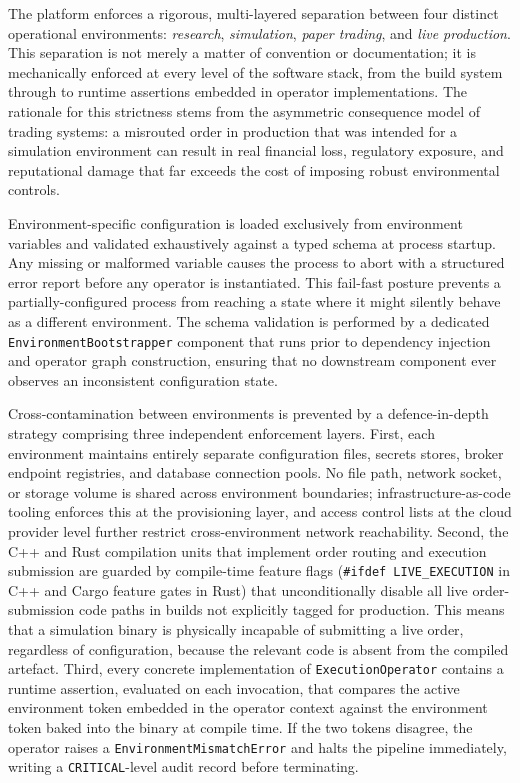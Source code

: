 \documentclass[12pt,openany]{book}
\numberwithin{equation}{chapter}
\theoremstyle{plain}
\theoremstyle{definition}
\theoremstyle{remark}
\begin{document}
The platform enforces a rigorous, multi-layered separation between four distinct operational environments: \emph{research}, \emph{simulation}, \emph{paper trading}, and \emph{live production}. This separation is not merely a matter of convention or documentation; it is mechanically enforced at every level of the software stack, from the build system through to runtime assertions embedded in operator implementations. The rationale for this strictness stems from the asymmetric consequence model of trading systems: a misrouted order in production that was intended for a simulation environment can result in real financial loss, regulatory exposure, and reputational damage that far exceeds the cost of imposing robust environmental controls.

Environment-specific configuration is loaded exclusively from environment variables and validated exhaustively against a typed schema at process startup. Any missing or malformed variable causes the process to abort with a structured error report before any operator is instantiated. This fail-fast posture prevents a partially-configured process from reaching a state where it might silently behave as a different environment. The schema validation is performed by a dedicated \texttt{EnvironmentBootstrapper} component that runs prior to dependency injection and operator graph construction, ensuring that no downstream component ever observes an inconsistent configuration state.

Cross-contamination between environments is prevented by a defence-in-depth strategy comprising three independent enforcement layers. First, each environment maintains entirely separate configuration files, secrets stores, broker endpoint registries, and database connection pools. No file path, network socket, or storage volume is shared across environment boundaries; infrastructure-as-code tooling enforces this at the provisioning layer, and access control lists at the cloud provider level further restrict cross-environment network reachability. Second, the C++ and Rust compilation units that implement order routing and execution submission are guarded by compile-time feature flags (\texttt{\#ifdef LIVE\_EXECUTION} in C++ and Cargo feature gates in Rust) that unconditionally disable all live order-submission code paths in builds not explicitly tagged for production. This means that a simulation binary is physically incapable of submitting a live order, regardless of configuration, because the relevant code is absent from the compiled artefact. Third, every concrete implementation of \texttt{ExecutionOperator} contains a runtime assertion, evaluated on each invocation, that compares the active environment token embedded in the operator context against the environment token baked into the binary at compile time. If the two tokens disagree, the operator raises a \texttt{EnvironmentMismatchError} and halts the pipeline immediately, writing a \texttt{CRITICAL}-level audit record before terminating.
\end{document}
